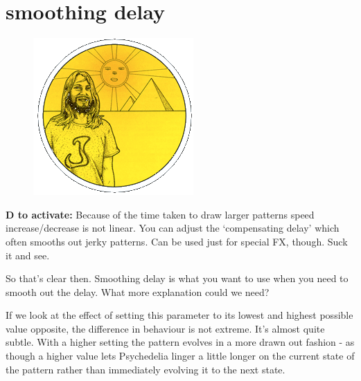 \clearpage

\section*{smoothing delay} 
\label{sec:delay}
\lstset{style=6502Style}
\lstset{ 
   aboveskip=5pt,
   belowskip=0pt,
}

\begin{definition}
\setlength{\intextsep}{0pt}%
\setlength{\columnsep}{3pt}%
\begin{figure}
\includegraphics[width=\linewidth]{src/callout/psych.png} 
\end{figure}
\small
\textbf{D to activate:} Because of the time taken to
draw larger patterns speed increase/decrease is not linear. You
can adjust the ‘compensating delay’ which often smooths out jerky
patterns. Can be used just for special FX, though. Suck it and see.
\end{definition}

So that's clear then. Smoothing delay is what you want to use when
you need to smooth out the delay. What more explanation could we need?

If we look at the effect of setting this parameter to its lowest and
highest possible value opposite, the difference in behaviour is not
extreme. It's almost quite subtle. With a higher setting the pattern
evolves in a more drawn out fashion - as though a higher value lets
Psychedelia linger a little longer on the current state of the pattern
rather than immediately evolving it to the next state.

